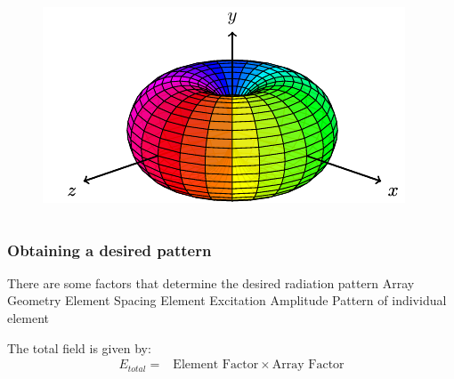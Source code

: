 \documentclass[10pt]{beamer}
\begin{document}
\begin{frame}
\begin{columns}[T]
\begin{column}{.4\textwidth}
            \begin{figure}[h!]
                \centering
                \includegraphics[width=.9\textwidth]{3d_pattern.pdf}
            \end{figure}
        \end{column}%
    \end{columns}
\end{frame}

\begin{frame}
    \frametitle{Obtaining a desired pattern}

    \begin{outline}
        \1 There are some factors that determine the desired radiation pattern
        \2 Array Geometry
        \2 Element Spacing
        \2 Element Excitation Amplitude
        \2 Pattern of individual element
    \end{outline}
The total field is given by:
\begin{align*}
    E_{total} {}=& \mathrm{Element \, \, Factor}  \times \mathrm{Array \, \, Factor}
\end{align*}
\end{frame}
\end{document}
